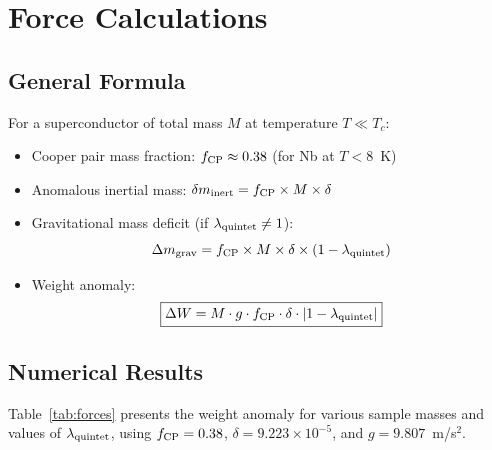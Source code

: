 \documentclass[12pt,a4paper]{article}
\theoremstyle{definition}
\theoremstyle{remark}
\begin{document}
\section{Force Calculations}\label{sec:force}

\subsection{General Formula}

For a superconductor of total mass $M$ at temperature $T \ll T_c$:

\begin{itemize}
\item Cooper pair mass fraction: $f_{\rm CP} \approx 0.38$ (for Nb at $T < 8$~K)
\item Anomalous inertial mass: $\delta m_{\rm inert} = f_{\rm CP} \times M \times \delta$
\item Gravitational mass deficit (if $\lambda_{\rm quintet} \neq 1$):
\begin{equation}
\Delta m_{\rm grav} = f_{\rm CP} \times M \times \delta \times (1 - \lambda_{\rm quintet})
\end{equation}
\item Weight anomaly:
\begin{equation}\label{eq:weight}
\boxed{\Delta W = M \cdot g \cdot f_{\rm CP} \cdot \delta \cdot |1 - \lambda_{\rm quintet}|}
\end{equation}
\end{itemize}

\subsection{Numerical Results}

Table~\ref{tab:forces} presents the weight anomaly for various sample masses
and values of $\lambda_{\rm quintet}$, using $f_{\rm CP} = 0.38$,
$\delta = 9.223 \times 10^{-5}$, and $g = 9.807$~m/s$^2$.
\end{document}
